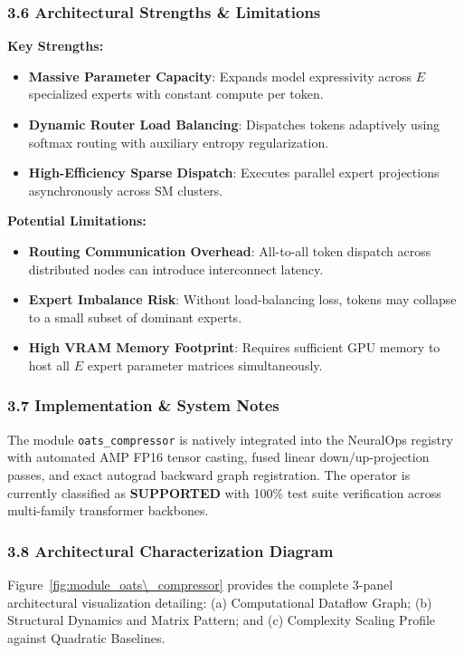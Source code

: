 \subsubsection*{3.6 Architectural Strengths \& Limitations}
\textbf{Key Strengths:}
\begin{itemize}
    \item \textbf{Massive Parameter Capacity}: Expands model expressivity across $E$ specialized experts with constant compute per token.
    \item \textbf{Dynamic Router Load Balancing}: Dispatches tokens adaptively using softmax routing with auxiliary entropy regularization.
    \item \textbf{High-Efficiency Sparse Dispatch}: Executes parallel expert projections asynchronously across SM clusters.
\end{itemize}

\textbf{Potential Limitations:}
\begin{itemize}
    \item \textbf{Routing Communication Overhead}: All-to-all token dispatch across distributed nodes can introduce interconnect latency.
    \item \textbf{Expert Imbalance Risk}: Without load-balancing loss, tokens may collapse to a small subset of dominant experts.
    \item \textbf{High VRAM Memory Footprint}: Requires sufficient GPU memory to host all $E$ expert parameter matrices simultaneously.
\end{itemize}

\subsubsection*{3.7 Implementation \& System Notes}
The module \texttt{oats\_compressor} is natively integrated into the NeuralOps registry with automated AMP FP16 tensor casting, fused linear down/up-projection passes, and exact autograd backward graph registration. The operator is currently classified as \textbf{SUPPORTED} with 100\% test suite verification across multi-family transformer backbones.

\subsubsection*{3.8 Architectural Characterization Diagram}
Figure~\ref{fig:module_oats\_compressor} provides the complete 3-panel architectural visualization detailing: (a) Computational Dataflow Graph; (b) Structural Dynamics and Matrix Pattern; and (c) Complexity Scaling Profile against Quadratic Baselines.

